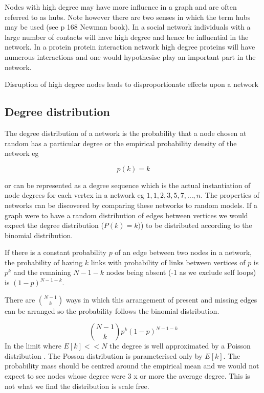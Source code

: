  Nodes with high degree may have more influence in a graph and are often referred to as hubs. Note however there are two senses in which the term hubs may be used (see p 168 Newman book\cite{newman2018networks}).  In a social network  individuals with a large number of contacts will have high degree and hence be influential in the network. In a protein protein interaction network high degree proteins will have numerous interactions and one would hypothesise play an important part in the network. 
 
 Disruption of high degree nodes leads to disproportionate effects upon a network \cite{jeong2001lethality} \cite{albert2000error} 

\subsection{Degree distribution}
\label{sec:degree distribution}
The degree distribution of a network is the probability that a node chosen at random has a particular degree or the empirical probability density of the network eg

\begin{equation}
    p(k) = k
\end{equation}

or can be represented as a degree sequence which is the actual instantiation of node degrees for each vertex in a network eg $1,1,2,3,5,7,\dots,n$. The properties of networks can be discovered by comparing these networks to random models. 
If a graph were to have a random distribution of edges between vertices we would expect the degree distribution ($P(k)=k)$) to be distributed according to the binomial distribution.  

If there is a constant probability $p$ of an edge between two nodes in a network, the probability of having $k$ links with probability of links between vertices of $p$ is $p^k$ and the remaining $N-1-k$ nodes being absent (-1 as we exclude self loops) is $(1-p)^{N-1-k}$.

There are $\binom{N-1}{k}$ ways in which this arrangement of present and missing edges can be arranged so the probability follows the binomial distribution.

\begin{equation}
   \binom{N-1}{k}        p^k (1-p)^{N-1-k}
   \label{Equation:BinomialDistributionForDegreeProbability}
\end{equation}
In the limit where $E[k] << N$ the degree is well approximated by a Poisson distribution \cite{barabasi2016network}. The Posson distribution is parameterised only by $E[k]$.  The probability mass should be centred around the empirical mean and we would not expect to see nodes whose degree were 3 x or more the average degree. This is not what we find the distribution is scale free.  


